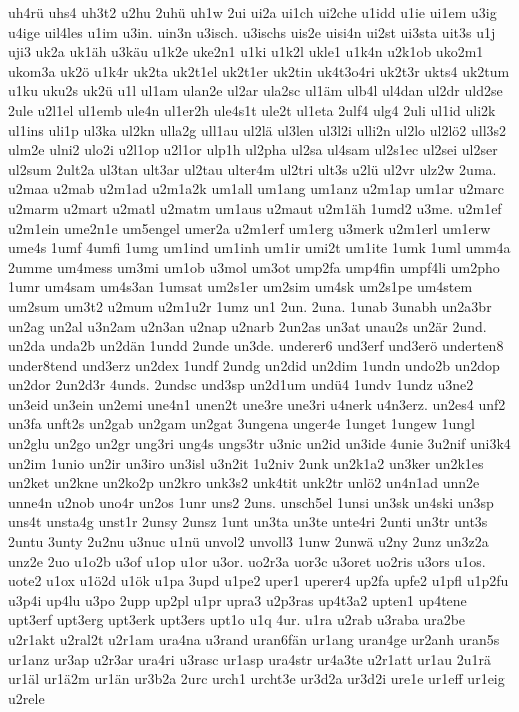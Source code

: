 {uh4rü
uhs4
uh3t2
u2hu
2uhü
uh1w
2ui
ui2a
ui1ch
ui2che
u1idd
u1ie
ui1em
u3ig
u4ige
uil4les
u1im
u3in.
uin3n
u3isch.
u3ischs
uis2e
uisi4n
ui2st
ui3sta
uit3s
u1j
uji3
uk2a
uk1äh
u3käu
u1k2e
uke2n1
u1ki
u1k2l
ukle1
u1k4n
u2k1ob
uko2m1
ukom3a
uk2ö
u1k4r
uk2ta
uk2t1el
uk2t1er
uk2tin
uk4t3o4ri
uk2t3r
ukts4
uk2tum
u1ku
uku2s
uk2ü
u1l
ul1am
ulan2e
ul2ar
ula2sc
ul1äm
ulb4l
ul4dan
ul2dr
uld2se
2ule
u2l1el
ul1emb
ule4n
ul1er2h
ule4s1t
ule2t
ul1eta
2ulf4
ulg4
2uli
ul1id
uli2k
ul1ins
uli1p
ul3ka
ul2kn
ulla2g
ull1au
ul2lä
ul3len
ul3l2i
ulli2n
ul2lo
ul2lö2
ull3s2
ulm2e
ulni2
ulo2i
u2l1op
u2l1or
ulp1h
ul2pha
ul2sa
ul4sam
ul2s1ec
ul2sei
ul2ser
ul2sum
2ult2a
ul3tan
ult3ar
ul2tau
ulter4m
ul2tri
ult3s
u2lü
ul2vr
ulz2w
2uma.
u2maa
u2mab
u2m1ad
u2m1a2k
um1all
um1ang
um1anz
u2m1ap
um1ar
u2marc
u2marm
u2mart
u2matl
u2matm
um1aus
u2maut
u2m1äh
1umd2
u3me.
u2m1ef
u2m1ein
ume2n1e
um5engel
umer2a
u2m1erf
um1erg
u3merk
u2m1erl
um1erw
ume4s
1umf
4umfi
1umg
um1ind
um1inh
um1ir
umi2t
um1ite
1umk
1uml
umm4a
2umme
um4mess
um3mi
um1ob
u3mol
um3ot
ump2fa
ump4fin
umpf4li
um2pho
1umr
um4sam
um4s3an
1umsat
um2s1er
um2sim
um4sk
um2s1pe
um4stem
um2sum
um3t2
u2mum
u2m1u2r
1umz
un1
2un.
2una.
1unab
3unabh
un2a3br
un2ag
un2al
u3n2am
u2n3an
u2nap
u2narb
2un2as
un3at
unau2s
un2är
2und.
un2da
unda2b
un2dän
1undd
2unde
un3de.
underer6
und3erf
und3erö
underten8
under8tend
und3erz
un2dex
1undf
2undg
un2did
un2dim
1undn
undo2b
un2dop
un2dor
2un2d3r
4unds.
2undsc
und3sp
un2d1um
undü4
1undv
1undz
u3ne2
un3eid
un3ein
un2emi
une4n1
unen2t
une3re
une3ri
u4nerk
u4n3erz.
un2es4
unf2
un3fa
unft2s
un2gab
un2gam
un2gat
3ungena
unger4e
1unget
1ungew
1ungl
un2glu
un2go
un2gr
ung3ri
ung4s
ungs3tr
u3nic
un2id
un3ide
4unie
3u2nif
uni3k4
un2im
1unio
un2ir
un3iro
un3isl
u3n2it
1u2niv
2unk
un2k1a2
un3ker
un2k1es
un2ket
un2kne
un2ko2p
un2kro
unk3s2
unk4tit
unk2tr
unlö2
un4n1ad
unn2e
unne4n
u2nob
uno4r
un2os
1unr
uns2
2uns.
unsch5el
1unsi
un3sk
un4ski
un3sp
uns4t
unsta4g
unst1r
2unsy
2unsz
1unt
un3ta
un3te
unte4ri
2unti
un3tr
unt3s
2untu
3unty
2u2nu
u3nuc
u1nü
unvol2
unvoll3
1unw
2unwä
u2ny
2unz
un3z2a
unz2e
2uo
u1o2b
u3of
u1op
u1or
u3or.
uo2r3a
uor3c
u3oret
uo2ris
u3ors
u1os.
uote2
u1ox
u1ö2d
u1ök
u1pa
3upd
u1pe2
uper1
uperer4
up2fa
upfe2
u1pfl
u1p2fu
u3p4i
up4lu
u3po
2upp
up2pl
u1pr
upra3
u2p3ras
up4t3a2
upten1
up4tene
upt3erf
upt3erg
upt3erk
upt3ers
upt1o
u1q
4ur.
u1ra
u2rab
u3raba
ura2be
u2r1akt
u2ral2t
u2r1am
ura4na
u3rand
uran6fän
ur1ang
uran4ge
ur2anh
uran5s
ur1anz
ur3ap
u2r3ar
ura4ri
u3rasc
ur1asp
ura4str
ur4a3te
u2r1att
ur1au
2u1rä
ur1äl
ur1ä2m
ur1än
ur3b2a
2urc
urch1
urcht3e
ur3d2a
ur3d2i
ure1e
ur1eff
ur1eig
u2rele
}

